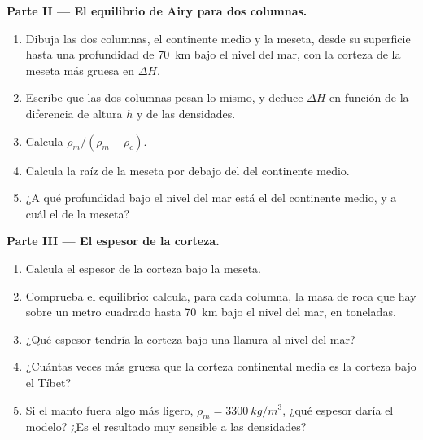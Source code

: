 \begin{problem}
\medskip
\noindent\textbf{Parte II --- El equilibrio de Airy para dos columnas.}
\begin{enumerate}[resume]
  \item Dibuja las dos columnas, el continente medio y la meseta, desde su
        superficie hasta una profundidad de \qty{70}{km} bajo el nivel del
        mar, con la corteza de la meseta más gruesa en $\Delta H$.
  \item Escribe que las dos columnas pesan lo mismo, y deduce $\Delta H$ en
        función de la diferencia de altura $h$ y de las densidades.
  \item Calcula $\rho_m/(\rho_m - \rho_c)$.
  \item Calcula la raíz de la meseta por debajo del  del continente
        medio.
  \item ¿A qué profundidad bajo el nivel del mar está el  del continente
        medio, y a cuál el de la meseta?
\end{enumerate}

\medskip
\noindent\textbf{Parte III --- El espesor de la corteza.}
\begin{enumerate}[resume]
  \item Calcula el espesor de la corteza bajo la meseta.
  \item Comprueba el equilibrio: calcula, para cada columna, la masa de roca
        que hay sobre un metro cuadrado hasta \qty{70}{km} bajo el nivel del
        mar, en toneladas.
  \item ¿Qué espesor tendría la corteza bajo una llanura al nivel del mar?
  \item ¿Cuántas veces más gruesa que la corteza continental media es la
        corteza bajo el Tíbet?
  \item Si el manto fuera algo más ligero, $\rho_m = \qty{3300}{kg/m^3}$,
        ¿qué espesor daría el modelo? ¿Es el resultado muy sensible a las
        densidades?
\end{enumerate}


\end{problem}
